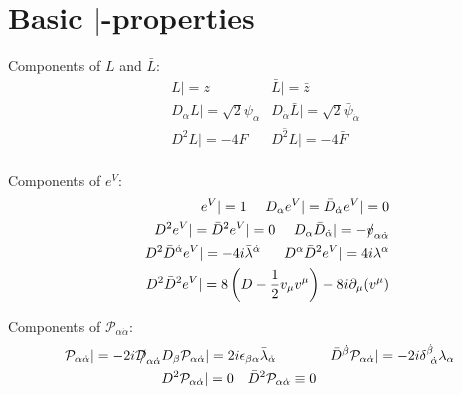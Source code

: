 \documentclass[a4paper,12pt]{article}
\newcommand{\slashed}[1]{\hbox{{$#1$}\llap{$/$}}}
\begin{document}
\section{Basic $|$-properties}
   Components of 
$ L $
   and
$ \bar{L} $:
\begin{eqnarray*}
    & L | = z                &  \bar{L} | = \bar{z} \\
    & D_\alpha L | = \sqrt{2} \psi_\alpha &
        D_{\dot{\alpha}} \bar{L} | = \sqrt{2} \bar{\psi}_{\dot{\alpha}} \\
    & D^2 L | = - 4 F        &  \overline{D^2 L} | = - 4 \bar{F} \\        
\end{eqnarray*}

   Components of 
   $ e^V $:
\begin{eqnarray*}
 &&  ~~~~e^V | = 1~~~~ D_\alpha e^V | = \bar{D}_{\dot{\alpha}} e^V | = 0  \\
 &&  D^2 e^V | = \bar{D}^2 e^V | = 0 ~~~~  
 D_\alpha \bar{D}_{\dot{\alpha}} | = - \slashed{v}_{\alpha\dot{\alpha}} \\
 &&  D^2 \bar{D}^{\dot{\alpha}} e^V | = - 4 i \bar{\lambda}^{\dot{\alpha}}~~~~~
     D^\alpha \bar{D}^2 e^V | = 4 i \lambda^\alpha \\
 && D^2 \bar{D}^2 e^V | = 8 \left( D - \frac{1}{2} v_\mu v^\mu \right) - 8 i \partial_\mu (v^\mu) 
\end{eqnarray*} 

  Components of   
$ \mathcal{P}_{\alpha\dot{\alpha}} $:
\begin{eqnarray*}
  \mathcal{P}_{\alpha\dot{\alpha}} | = - 2 i \slashed{\mathcal{D}}_{\alpha\dot{\alpha}} &
  D_\beta \mathcal{P}_{\alpha\dot{\alpha}} | =
            2 i \epsilon_{\beta\alpha}\bar{\lambda}_{\dot{\alpha}} &
  \bar{D}^{\dot{\beta}} \mathcal{P}_{\alpha\dot{\alpha}} | =
       - 2 i \delta^{\dot{\beta}}_{~\dot{\alpha}} \lambda_\alpha \\
  & D^2 \mathcal{P}_{\alpha\dot{\alpha}} | = 0 ~~~
  \bar{D}^2 \mathcal{P}_{\alpha\dot{\alpha}} \equiv 0 &
\end{eqnarray*}
\end{document}
